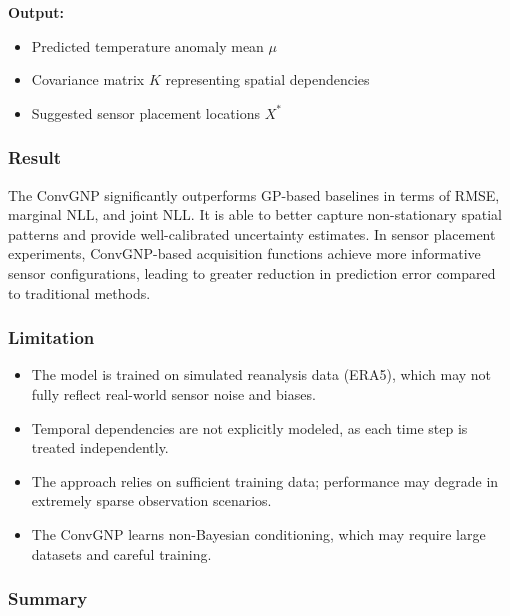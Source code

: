 \documentclass[12pt,a4paper]{article}
\begin{document}
                \textbf{Output:}
                \begin{itemize}
                    \item Predicted temperature anomaly mean $\mu$
                    \item Covariance matrix $K$ representing spatial dependencies
                    \item Suggested sensor placement locations $X^*$
                \end{itemize}

    \subsubsection{Result}

            The ConvGNP significantly outperforms GP-based baselines in terms of RMSE, marginal NLL, and joint NLL. It is able to better capture non-stationary spatial patterns and provide well-calibrated uncertainty estimates. In sensor placement experiments, ConvGNP-based acquisition functions achieve more informative sensor configurations, leading to greater reduction in prediction error compared to traditional methods.
            

    \subsubsection{Limitation}
    
                \begin{itemize}
                    \item The model is trained on simulated reanalysis data (ERA5), which may not fully reflect real-world sensor noise and biases.
                    \item Temporal dependencies are not explicitly modeled, as each time step is treated independently.
                    \item The approach relies on sufficient training data; performance may degrade in extremely sparse observation scenarios.
                    \item The ConvGNP learns non-Bayesian conditioning, which may require large datasets and careful training.
                \end{itemize}
    
    \subsubsection{Summary}
\end{document}
